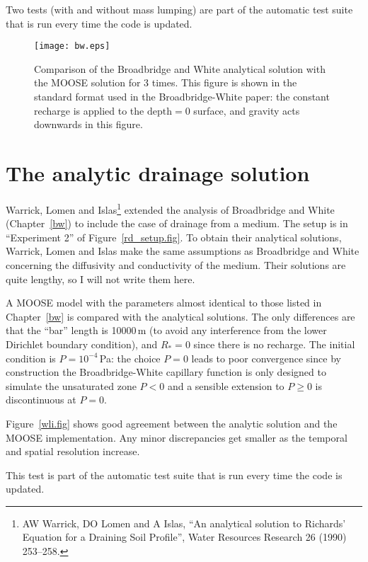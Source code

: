 \documentclass[]{scrreprt}
\begin{document}
Two tests (with and without mass lumping) are part of the automatic
test suite that is run every time the code is updated.

\begin{figure}[htb]
\centering
\texttt{[image: bw.eps]}
\caption{Comparison of the Broadbridge and White analytical solution
  with the MOOSE solution for 3 times.  This figure is shown in the
  standard format used in the Broadbridge-White paper: the constant
  recharge is applied to the $\mbox{depth}=0$ surface, and gravity
  acts downwards in this figure.}
\label{bw.fig}
\end{figure}





\chapter{The analytic drainage solution}
\label{wli}

Warrick, Lomen and Islas\footnote{AW Warrick, DO Lomen and A Islas,
  ``An analytical solution to Richards' Equation for a Draining Soil
  Profile'', Water Resources Research 26 (1990) 253--258.} extended
the analysis of Broadbridge and White (Chapter~\ref{bw}) to include
the case of drainage from a medium.  The setup is in ``Experiment 2'' of
Figure~\ref{rd_setup.fig}.  To obtain their analytical
solutions, Warrick, Lomen and Islas make the same assumptions as
Broadbridge and White concerning the diffusivity and conductivity of
the medium.  Their solutions are quite lengthy, so I will not write
them here.

A MOOSE model with the parameters almost identical to those listed in
Chapter~\ref{bw} is compared with the analytical solutions.  The only
differences are that the ``bar'' length is 10000\,m (to avoid any
interference from the lower Dirichlet boundary condition), and
$R_{\ast}=0$ since there is no recharge.  The initial condition is
$P=10^{-4}$\,Pa: the choice $P=0$ leads to poor convergence since
by construction the Broadbridge-White capillary function is only
designed to simulate the unsaturated zone $P<0$ and a sensible
extension to $P\geq 0$ is discontinuous at $P=0$.

Figure~\ref{wli.fig} shows good agreement between the analytic
solution and the MOOSE implementation.  Any minor discrepancies get
smaller as the temporal and spatial resolution increase.

This test is part of the automatic test suite that is run every time
the code is updated.
\end{document}
